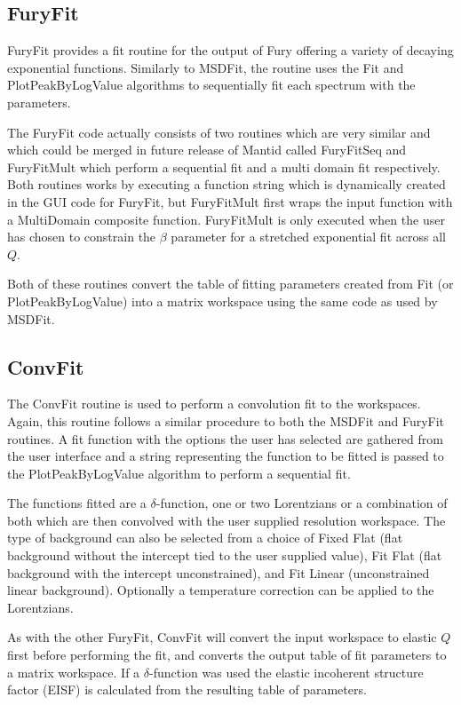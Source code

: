 \documentclass[paper=a4, fontsize=11pt]{scrartcl}	%
\numberwithin{equation}{section}															%
\numberwithin{figure}{section}																%
\numberwithin{table}{section}																%
\begin{document}
\subsection{FuryFit}
FuryFit provides a fit routine for the output of Fury offering a variety of decaying exponential functions. Similarly to MSDFit, the routine uses the Fit and PlotPeakByLogValue algorithms to sequentially fit each spectrum with the parameters.

The FuryFit code actually consists of two routines which are very similar and which could be merged in future release of Mantid called FuryFitSeq and FuryFitMult which perform a sequential fit and a multi domain fit respectively. Both routines works by executing a function string which is dynamically created in the GUI code for FuryFit, but FuryFitMult first wraps the input function with a MultiDomain composite function. FuryFitMult is only executed when the user has chosen to constrain the $\beta$ parameter for a stretched exponential fit across all $Q$.

Both of these routines convert the table of fitting parameters created from Fit (or PlotPeakByLogValue) into a matrix workspace using the same code as used by MSDFit.

\subsection{ConvFit}
The ConvFit routine is used to perform a convolution fit to the workspaces. Again, this routine follows a similar procedure to both the MSDFit and FuryFit routines. A fit function with the options the user has selected are gathered from the user interface and a string representing the function to be fitted is passed to the PlotPeakByLogValue algorithm to perform a sequential fit.

The functions fitted are a $\delta$-function, one or two Lorentzians or a combination of both which are then convolved with the user supplied resolution workspace. The type of background can also be selected from a choice of Fixed Flat (flat background without the intercept tied to the user supplied value), Fit Flat (flat background with the intercept unconstrained), and Fit Linear (unconstrained linear background). Optionally a temperature correction can be applied to the Lorentzians.

As with the other FuryFit, ConvFit will convert the input workspace to elastic $Q$ first before performing the fit, and converts the output table of fit parameters to a matrix workspace. If a $\delta$-function was used the elastic incoherent structure factor (EISF) is calculated from the resulting table of parameters.
\end{document}
